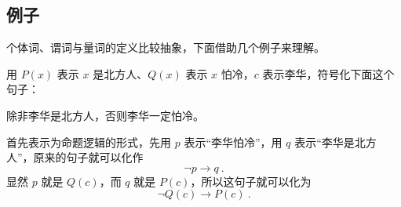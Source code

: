 \subsection{例子}
个体词、谓词与量词的定义比较抽象，下面借助几个例子来理解。

\begin{example}{}
用 $P(x)$ 表示 $x$ 是北方人、$Q(x)$ 表示 $x$ 怕冷，$c$ 表示李华，符号化下面这个句子：

除非李华是北方人，否则李华一定怕冷。
\end{example}
首先表示为命题逻辑的形式，先用 $p$ 表示“李华怕冷”，用 $q$ 表示“李华是北方人”，原来的句子就可以化作
\begin{equation}
\neg p \to  q ~.
\end{equation}
显然 $p$ 就是 $Q(c)$，而 $q$ 就是 $P(c)$，所以这句子就可以化为
\begin{equation}
\neg Q(c) \to  P(c) ~.
\end{equation}
